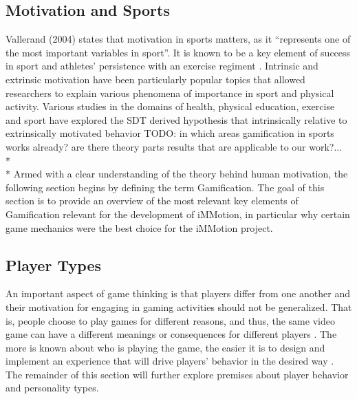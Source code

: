\subsection{Motivation and Sports}
Vallerand (2004) states that motivation in sports matters, as it ``represents one of the most important variables in sport''. It is known to be a key element of success in sport and athletes' persistence with an exercise regiment \cite{vallerand2007intrinsic}. Intrinsic and extrinsic motivation have been particularly popular topics that allowed researchers to explain various phenomena of importance in sport and physical activity. Various studies in the domains of health, physical education, exercise and sport have explored the SDT derived hypothesis that intrinsically relative to extrinsically motivated behavior  
TODO: in which areas gamification in sports works already? are there theory parts results that are applicable to our work?...\\*\\*
Armed with a clear understanding of the theory behind human motivation, the following section begins by defining the term Gamification. The goal of this section is to provide an overview of the most relevant key elements of Gamification relevant for the development of iMMotion, in particular why certain game mechanics were the best choice for the iMMotion project.
\subsection{Player Types}
An important aspect of game thinking is that players differ from one another and their motivation for engaging in gaming activities should not be generalized. That is, people choose to play games for different reasons, and thus, the same video game can have a different meanings or consequences for different players \cite{yee2006motivations}. The more is known about who is playing the game, the easier it is to design and implement an experience that will drive players' behavior in the desired way \cite{zichermann2011gamification}. The  remainder  of  this section will further explore premises about player behavior and personality types.
